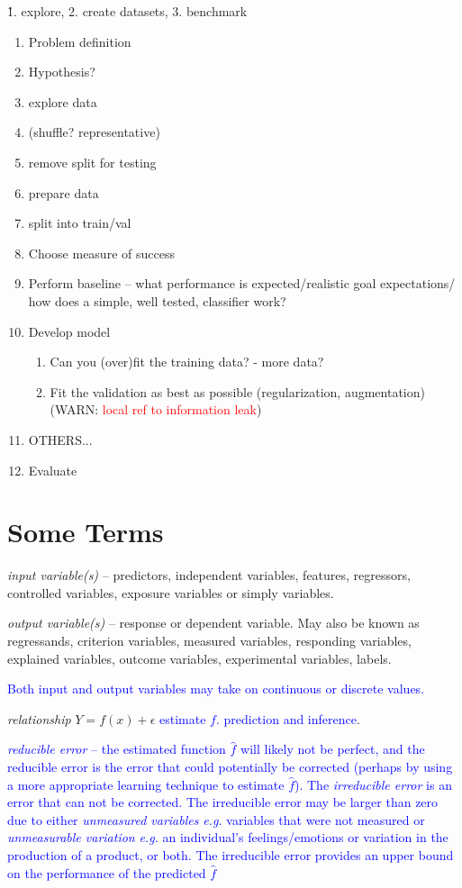 \r{1. explore, 2. create datasets, 3. benchmark}
\begin{enumerate}[noitemsep,topsep=0pt]
	\item Problem definition
	\item Hypothesis?
	\item explore data
	\item (shuffle? representative)
	\item remove split for testing
	\item prepare data
	\item split into train/val
	\item Choose measure of success
	\item Perform baseline -- what performance is expected/realistic goal expectations/ how does a simple, well tested, classifier work?
	\item Develop model
	\begin{enumerate}[noitemsep,topsep=0pt]
		\item Can you (over)fit the training data? - more data?
		\item Fit the validation as best as possible (regularization, augmentation) (WARN: \textcolor{red}{local ref to information leak})
	\end{enumerate}
	\item OTHERS...
	\item Evaluate
\end{enumerate}


\section{Some Terms}

\emph{input variable(s)} -- predictors, independent variables, features, regressors, controlled variables, exposure variables or simply variables.
 
\emph{output variable(s)} -- response or dependent variable. May also be known as regressands, criterion variables, measured variables, responding variables, explained variables, outcome variables, experimental variables, labels.

\textcolor{blue}{Both input and output variables may take on continuous or discrete values.}

\emph{relationship} $Y = f(x) + \epsilon$ \textcolor{blue}{estimate $f$. prediction and inference}.

\textcolor{blue}{\emph{{reducible error}} -- the estimated function $\hat{f}$ will likely not be perfect, and the reducible error is the error that could potentially be corrected (perhaps by using a more appropriate learning technique to estimate $\hat{f}$).  The \emph{irreducible error} is an error that can not be corrected. The irreducible error may be larger than zero due to either \emph{unmeasured variables} \emph{e.g.} variables that were not measured or \emph{unmeasurable variation} \emph{e.g.} an individual's feelings/emotions or variation in the production of a product, or both. The irreducible error provides an upper bound on the performance of the predicted $\hat{f}$}

